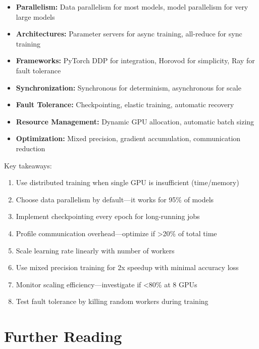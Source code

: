 \begin{itemize}
    \item \textbf{Parallelism:} Data parallelism for most models, model parallelism for very large models
    \item \textbf{Architectures:} Parameter servers for async training, all-reduce for sync training
    \item \textbf{Frameworks:} PyTorch DDP for integration, Horovod for simplicity, Ray for fault tolerance
    \item \textbf{Synchronization:} Synchronous for determinism, asynchronous for scale
    \item \textbf{Fault Tolerance:} Checkpointing, elastic training, automatic recovery
    \item \textbf{Resource Management:} Dynamic GPU allocation, automatic batch sizing
    \item \textbf{Optimization:} Mixed precision, gradient accumulation, communication reduction
\end{itemize}

Key takeaways:

\begin{enumerate}
    \item Use distributed training when single GPU is insufficient (time/memory)
    \item Choose data parallelism by default—it works for 95\% of models
    \item Implement checkpointing every epoch for long-running jobs
    \item Profile communication overhead—optimize if >20\% of total time
    \item Scale learning rate linearly with number of workers
    \item Use mixed precision training for 2x speedup with minimal accuracy loss
    \item Monitor scaling efficiency—investigate if <80\% at 8 GPUs
    \item Test fault tolerance by killing random workers during training
\end{enumerate}

\section{Further Reading}

